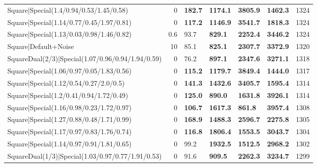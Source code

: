 \begin{tabular}{lrllllr}
 Square|Special(1.4/0.94/0.53/1.45/0.58)                       &             0   & \textbf{182.7} & \textbf{1174.1} & \textbf{3805.9} & \textbf{1462.3} &         1324 \\
 Square|Special(1.14/0.77/0.45/1.97/0.81)                      &             0   & \textbf{117.2} & \textbf{1146.9} & \textbf{3541.7} & \textbf{1818.3} &         1324 \\
 Square|Special(1.13/0.03/0.98/1.46/0.82)                      &             0.6 & 93.7           & \textbf{829.1}  & \textbf{2252.4} & \textbf{3446.2} &         1324 \\
 Square|Default+Noise                                          &            10   & 85.1           & \textbf{825.1}  & \textbf{2307.7} & \textbf{3372.9} &         1320 \\
 SquareDual(2/3)|Special(1.07/0.96/0.94/1.94/0.59)             &             0   & 76.2           & \textbf{897.1}  & \textbf{2347.6} & \textbf{3271.1} &         1318 \\
 Square|Special(1.06/0.97/0.05/1.83/0.56)                      &             0   & \textbf{115.2} & \textbf{1179.7} & \textbf{3849.4} & \textbf{1444.0} &         1317 \\
 Square|Special(1.12/0.54/0.27/2.0/0.5)                        &             0   & \textbf{141.3} & \textbf{1432.6} & \textbf{3405.7} & \textbf{1595.4} &         1314 \\
 Square|Special(1.2/0.41/0.94/1.72/0.49)                       &             0   & \textbf{125.0} & \textbf{890.0}  & \textbf{1631.8} & \textbf{3926.1} &         1314 \\
 Square|Special(1.16/0.98/0.23/1.72/0.97)                      &             0   & \textbf{106.7} & \textbf{1617.3} & \textbf{861.8}  & \textbf{3957.4} &         1308 \\
 Square|Special(1.27/0.88/0.48/1.71/0.99)                      &             0   & \textbf{168.9} & \textbf{1488.3} & \textbf{2596.7} & \textbf{2275.8} &         1305 \\
 Square|Special(1.17/0.97/0.83/1.76/0.74)                      &             0   & \textbf{116.8} & \textbf{1806.4} & \textbf{1553.5} & \textbf{3043.7} &         1304 \\
 Square|Special(1.14/0.97/0.91/1.81/0.65)                      &             0   & 99.2           & \textbf{1932.5} & \textbf{1512.5} & \textbf{2968.2} &         1302 \\
 SquareDual(1/3)|Special(1.03/0.97/0.77/1.91/0.53)             &             0   & 91.6           & \textbf{909.5}  & \textbf{2262.3} & \textbf{3234.7} &         1299 \\

\end{tabular}
